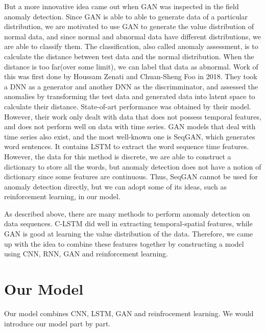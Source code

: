 \documentclass{acmtog} %
\begin{document}
But a more innovative idea came out when GAN was inspected in the field anomaly detection. Since GAN is able to able to generate data of a particular distribution, we are motivated to use GAN to generate the value distribution of normal data, and since normal and abnormal data have different distributions, we are able to classify them. The classification, also called anomaly assessment, is to calculate the distance between test data and the normal distribution. When the distance is too far(over some limit), we can label that data as abnormal. Work of this was first done by Houssam Zenati and Chuan-Sheng Foo in 2018. They took a DNN as a generator and another DNN as the discrimminator, and assessed the anomalies by transforming the test data and generated data into latent space to calculate their distance. State-of-art performance was obtained by their model. However, their work only dealt with data that does not possess temporal features, and does not perform well on data with time series. GAN models that deal with time series also exist, and the most well-known one is SeqGAN, which generates word sentences. It contains LSTM to extract the word sequence time features. However, the data for this method is discrete, we are able to construct a dictionary to store all the words, but anomaly detection does not have a notion of dictionary since some features are continuous. Thus, SeqGAN cannot be used for anomaly detection directly, but we can adopt some of its ideas, such as reinforcement learning, in our model.

As described above, there are many methods to perform anomaly detection on data sequences. C-LSTM did well in extracting temporal-spatial features, while GAN is good at learning the value distribution of the data. Therefore, we came up with the idea to combine these features together by constructing a model using CNN, RNN, GAN and reinforcement learning.


\section{Our Model}
Our model combines CNN, LSTM, GAN and reinfrocement learning. We would introduce our model part by part.
\end{document}
